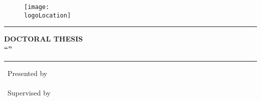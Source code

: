 
\thispagestyle{empty}

\begin{figure}
    \centering
    \texttt{[image: \\logoLocation]}
\end{figure}

\begin{center}
    \altfont\Large{\bfseries\department}
\end{center}

\vspace{1cm}

\hrule
\begin{center}
    \Large{\bfseries\altfont DOCTORAL THESIS}\\
    \vspace{0.3cm}
    \huge{\bf ``\thesisTitle''}
\end{center}
\vspace{0.3cm}
\hrule

\vspace{0.4cm}

\begin{center}
    \large{\altfont\ Presented by}\\
    \vspace{0.3cm}
    \Large{\authorMe}\\
    \vspace{0.7cm}
    \large{\altfont\ Supervised by}\\
    \vspace{0.3cm}
    \Large{\supervisorOne}\\
    \vspace{0.3cm}
    \Large{\supervisorTwo}\\
    \vspace{0.3cm}
    \Large{\supervisorThree}\par
    \vspace{0.3cm}
\end{center}

\vspace{1cm}
\begin{center}
    \altfont\large{\cityDate}
\end{center}

